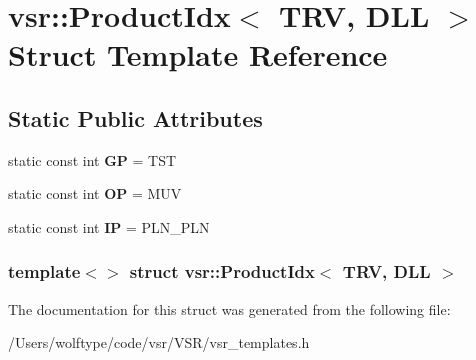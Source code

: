 \hypertarget{structvsr_1_1_product_idx_3_01_t_r_v_00_01_d_l_l_01_4}{\section{vsr\-:\-:Product\-Idx$<$ T\-R\-V, D\-L\-L $>$ Struct Template Reference}
\label{structvsr_1_1_product_idx_3_01_t_r_v_00_01_d_l_l_01_4}
}
\subsection*{Static Public Attributes}
\begin{DoxyCompactItemize}
\item 
\hypertarget{structvsr_1_1_product_idx_3_01_t_r_v_00_01_d_l_l_01_4_aa2e6d2926f0d11fc359122e622c0e56f}{static const int {\bfseries G\-P} = T\-S\-T}\label{structvsr_1_1_product_idx_3_01_t_r_v_00_01_d_l_l_01_4_aa2e6d2926f0d11fc359122e622c0e56f}

\item 
\hypertarget{structvsr_1_1_product_idx_3_01_t_r_v_00_01_d_l_l_01_4_ad8768c7000e7c3ef08f08ea7241ffcb2}{static const int {\bfseries O\-P} = M\-U\-V}\label{structvsr_1_1_product_idx_3_01_t_r_v_00_01_d_l_l_01_4_ad8768c7000e7c3ef08f08ea7241ffcb2}

\item 
\hypertarget{structvsr_1_1_product_idx_3_01_t_r_v_00_01_d_l_l_01_4_aecb705353729daf22822764ca8b44e39}{static const int {\bfseries I\-P} = P\-L\-N\-\_\-\-P\-L\-N}\label{structvsr_1_1_product_idx_3_01_t_r_v_00_01_d_l_l_01_4_aecb705353729daf22822764ca8b44e39}

\end{DoxyCompactItemize}
\subsubsection*{template$<$$>$ struct vsr\-::\-Product\-Idx$<$ T\-R\-V, D\-L\-L $>$}



The documentation for this struct was generated from the following file\-:\begin{DoxyCompactItemize}
\item 
/\-Users/wolftype/code/vsr/\-V\-S\-R/vsr\-\_\-templates.\-h\end{DoxyCompactItemize}
